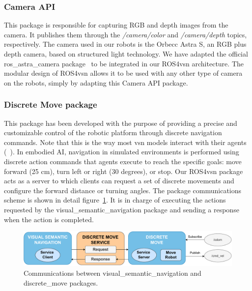\subsubsection{Camera API}\label{subsubsec:camera-api}

This package is responsible for capturing RGB and depth images from the camera.
It publishes them through the \textit{/camera/color} and \textit{/camera/depth} topics, respectively.
The camera used in our robots is the Orbecc Astra S, an RGB plus depth camera, based on structured light technology.
We have adapted the official ros\_astra\_camera package~\cite{orbeccros} to be integrated in our ROS4\acrshort{vsn} architecture.
The modular design of ROS4\acrshort{vsn} allows it to be used with any other type of camera on the robots, simply by adapting this Camera API package.

\subsubsection{Discrete Move package}\label{subsubsec:discrete-move-package}

This package has been developed with the purpose of providing a precise and customizable control of the robotic platform through discrete navigation commands.
Note that this is the way most \acrshort{vsn} models interact with their agents (\eg~\cite{ramrakhya2023,chang2020}).
In embodied AI, navigation in simulated environments is performed using discrete action commands that agents execute to reach the specific goals: move forward (25 cm), turn left or right (30 degrees), or stop.
Our ROS4\acrshort{vsn} package acts as a server to which clients can request a set of discrete movements and configure the forward distance or turning angles.
The package communications scheme is shown in detail figure~\ref{fig:discrete_move}.
It is in charge of executing the actions requested by the visual\_semantic\_navigation package and sending a response when the action is completed.

\begin{figure}
    \centering
    \includegraphics[width=\linewidth]{figures/ros4vsn/comunicaciones_service}
    \caption{Communications between visual\_semantic\_navigation and discrete\_move packages.}
    \label{fig:discrete_move}
\end{figure}

